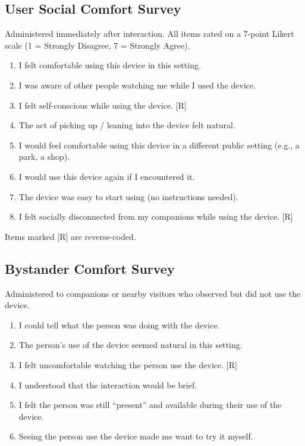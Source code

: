 \subsection{User Social Comfort Survey}

Administered immediately after interaction. All items rated on a 7-point Likert scale (1 = Strongly Disagree, 7 = Strongly Agree).

\begin{enumerate}
    \item I felt comfortable using this device in this setting.
    \item I was aware of other people watching me while I used the device.
    \item I felt self-conscious while using the device. [R]
    \item The act of picking up / leaning into the device felt natural.
    \item I would feel comfortable using this device in a different public setting (e.g., a park, a shop).
    \item I would use this device again if I encountered it.
    \item The device was easy to start using (no instructions needed).
    \item I felt socially disconnected from my companions while using the device. [R]
\end{enumerate}

Items marked [R] are reverse-coded.

\subsection{Bystander Comfort Survey}

Administered to companions or nearby visitors who observed but did not use the device.

\begin{enumerate}
    \item I could tell what the person was doing with the device.
    \item The person's use of the device seemed natural in this setting.
    \item I felt uncomfortable watching the person use the device. [R]
    \item I understood that the interaction would be brief.
    \item I felt the person was still ``present'' and available during their use of the device.
    \item Seeing the person use the device made me want to try it myself.
\end{enumerate}


